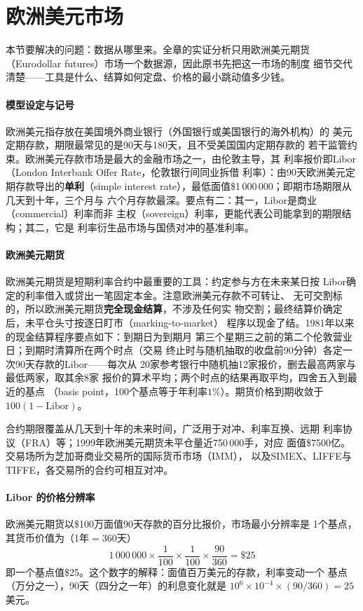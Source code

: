 \section{欧洲美元市场}

本节要解决的问题：数据从哪里来。全章的实证分析只用欧洲美元期货
（Eurodollar futures）市场一个数据源，因此原书先把这一市场的制度
细节交代清楚——工具是什么、结算如何定盘、价格的最小跳动值多少钱。

\paragraph{模型设定与记号}
欧洲美元指存放在美国境外商业银行（外国银行或美国银行的海外机构）的
美元定期存款，期限最常见的是90天与180天，且不受美国国内定期存款的
若干监管约束。欧洲美元存款市场是最大的金融市场之一，由伦敦主导，其
利率报价即Libor（London Interbank Offer Rate，伦敦银行间同业拆借
利率）：由90天欧洲美元定期存款导出的\textbf{单利}（simple interest
rate），最低面值\$1\,000\,000；即期市场期限从几天到十年，三个月与
六个月存款最深。要点有二：其一，Libor是商业（commercial）利率而非
主权（sovereign）利率，更能代表公司能拿到的期限结构；其二，它是
利率衍生品市场与国债对冲的基准利率。

\paragraph{欧洲美元期货}
欧洲美元期货是短期利率合约中最重要的工具：约定参与方在未来某日按
Libor确定的利率借入或贷出一笔固定本金。注意欧洲美元存款不可转让、
无可交割标的，所以欧洲美元期货\textbf{完全现金结算}，不涉及任何实
物交割；最终结算价确定后，未平仓头寸按逐日盯市（marking-to-market）
程序以现金了结。1981年以来的现金结算程序要点如下：到期日为到期月
第三个星期三之前的第二个伦敦营业日；到期时清算所在两个时点（交易
终止时与随机抽取的收盘前90分钟）各定一次90天存款的Libor——每次从
20家参考银行中随机抽12家报价，删去最高两家与最低两家，取其余8家
报价的算术平均；两个时点的结果再取平均，四舍五入到最近的基点
（basis point，100个基点等于年利率$1\%$）。期货价格到期收敛于
$100(1-\text{Libor})$。

合约期限覆盖从几天到十年的未来时间，广泛用于对冲、利率互换、远期
利率协议（FRA）等；1999年欧洲美元期货未平仓量近750\,000手，对应
面值\$7500亿。交易场所为芝加哥商业交易所的国际货币市场（IMM），
以及SIMEX、LIFFE与TIFFE，各交易所的合约可相互对冲。

\paragraph{Libor 的价格分辨率}
欧洲美元期货以\$100万面值90天存款的百分比报价，市场最小分辨率是
1个基点，其货币价值为（1年$=360$天）
\begin{equation*}
1\,000\,000\times\frac{1}{100}\times\frac{1}{100}\times\frac{90}{360}=\$25
\end{equation*}
即一个基点值\$25。这个数字的解释：面值百万美元的存款，利率变动一个
基点（万分之一），90天（四分之一年）的利息变化就是
$10^6\times10^{-4}\times(90/360)=25$美元。

